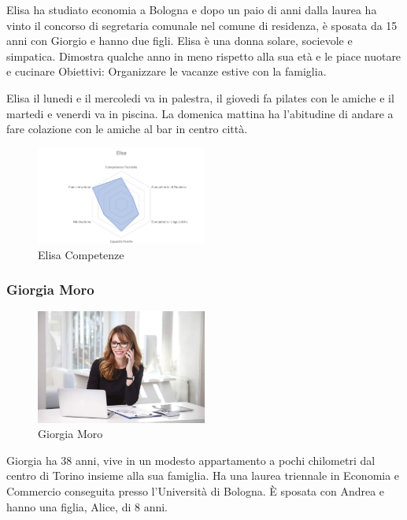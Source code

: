 \documentclass[12pt,italian,]{report}
\begin{document}
Elisa ha studiato economia a Bologna e dopo un paio di anni dalla laurea
ha vinto il concorso di segretaria comunale nel comune di residenza, è
sposata da 15 anni con Giorgio e hanno due figli. Elisa è una donna
solare, socievole e simpatica. Dimostra qualche anno in meno rispetto
alla sua età e le piace nuotare e cucinare Obiettivi: Organizzare le
vacanze estive con la famiglia.

Elisa il lunedi e il mercoledi va in palestra, il giovedi fa pilates con
le amiche e il martedi e venerdi va in piscina. La domenica mattina ha
l'abitudine di andare a fare colazione con le amiche al bar in centro
città.

\begin{figure}[h]
\centering
\includegraphics[width=0.5\textwidth,height=\textheight]{img/elisa_competenze.png}
\caption{Elisa Competenze}
\end{figure}

\hypertarget{giorgia-moro-1}{%
\subsubsection{Giorgia Moro}\label{giorgia-moro-1}}

\begin{figure}[h]
\centering
\includegraphics[width=0.5\textwidth,height=\textheight]{img/giorgia.jpg}
\caption{Giorgia Moro}
\end{figure}

Giorgia ha 38 anni, vive in un modesto appartamento a pochi chilometri
dal centro di Torino insieme alla sua famiglia. Ha una laurea triennale
in Economia e Commercio conseguita presso l'Università di Bologna. È
sposata con Andrea e hanno una figlia, Alice, di 8 anni.
\end{document}
